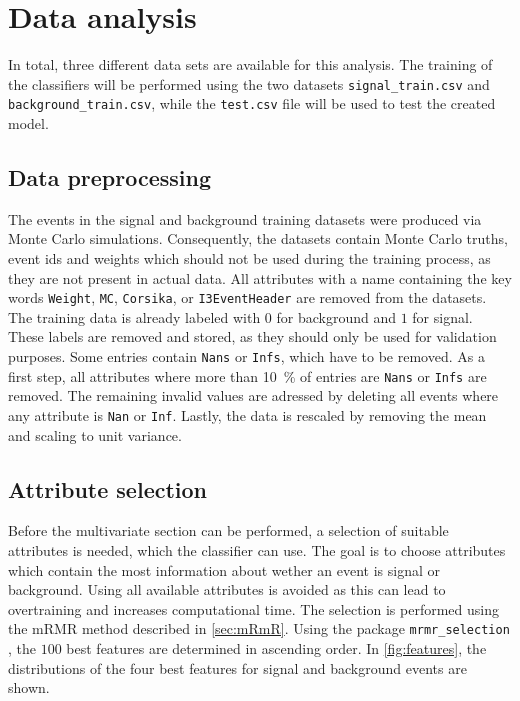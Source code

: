 \section{Data analysis}
\label{sec:Auswertung}

In total, three different data sets are available for this analysis. 
The training of the classifiers will be performed using the two datasets
\texttt{signal\_train.csv} and \texttt{background\_train.csv}, while the
\texttt{test.csv} file will be used to test the created model.

\subsection{Data preprocessing}

The events in the signal and background training datasets were produced via Monte Carlo simulations.
Consequently, the datasets contain Monte Carlo truths, event ids and weights which should not be
used during the training process, as they are not present in actual data.
All attributes with a name containing the key words \texttt{Weight}, \texttt{MC}, \texttt{Corsika}, or
\texttt{I3EventHeader} are removed from the datasets.
The training data is already labeled with $0$ for background and $1$ for signal. These labels are removed and 
stored, as they should only be used for validation purposes. Some entries contain \texttt{Nans} or
\texttt{Infs}, which have to be removed. As a first step, all attributes where more than \qty{10}{\percent}
of entries are \texttt{Nans} or \texttt{Infs} are removed. The remaining invalid values are adressed by
deleting all events where any attribute is \texttt{Nan} or \texttt{Inf}.
Lastly, the data is rescaled by removing the mean and scaling to unit variance.

\subsection{Attribute selection}
\label{sec:att_selection}

Before the multivariate section can be performed, a selection of suitable attributes is needed, which the classifier
can use. The goal is to choose attributes which contain the most information about wether an event
is signal or background. Using all available attributes is avoided as this can lead to overtraining and
increases computational time.
The selection is performed using the mRMR method described in \autoref{sec:mRmR}. Using the package
\texttt{mrmr\_selection} \cite{mrmr}, the $100$ best features are determined in ascending order.
In \autoref{fig:features}, the distributions of the four best features for signal and background events
are shown.

